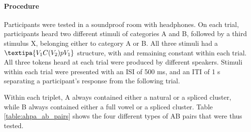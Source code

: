 {\begin{table*}[h]
\centering
\caption{{\color{blue}Types of AB pairs for Experiment 2. The discrimination accuracy is predicted according to whether epenthetic vowel quality is determined by the quality of flanking vowel (Flank.), coarticulation cues (Coart.), or whether participants experience default  epenthesis (Default) or do not experience epenthesis (No Epenth.). Cases of good discrimination are marked with plus signs.}}
\label{table:ahpa_ab_pairs}
\end{table*}

\paragraph{Procedure}
Participants were tested in a soundproof room with headphones. On each trial, participants heard two different stimuli of categories A and B, followed by a third stimulus X, belonging either to category A or B. All three stimuli had a $\textipa{V_{1}C(V_{2})pV_{1}}$ structure, with  and  remaining constant within each trial.  
All three tokens heard at each trial were produced by different speakers. Stimuli within each trial were presented with an ISI of 500 ms, and an ITI of 1 s separating a participant's response from the following trial.  

Within each triplet, A always contained either a natural or a spliced cluster, while B always contained either a full vowel or a spliced cluster. Table \ref{table:ahpa_ab_pairs} shows the four different types of AB pairs that were thus tested. 

}
